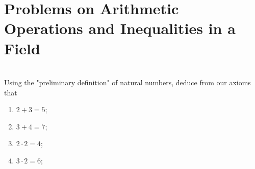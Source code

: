 \documentclass[12pt]{book}
\theoremstyle{definition}
\begin{document}



\section{Problems on Arithmetic Operations and Inequalities in a Field}

\begin{ex}[1]
\\
Using the "preliminary definition" of natural numbers, deduce from our axioms that
\begin{enumerate}[label=(\alph*)]
	\item $2+3=5$;
	\item $3+4=7$;
	\item $2\cdot 2=4$;
	\item $3\cdot 2=6$; 
\end{enumerate}  
\end{ex}
\end{document}
